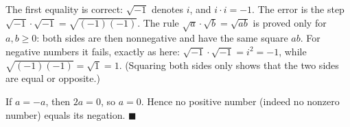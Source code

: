 The first equality is correct: $\sqrt{-1}$ denotes $i$, and $i\cdot i=-1$. The error is the step $\sqrt{-1}\cdot\sqrt{-1}=\sqrt{(-1)(-1)}$. The rule $\sqrt a\cdot\sqrt b=\sqrt{ab}$ is proved only for $a,b\ge0$: both sides are then nonnegative and have the same square $ab$. For negative numbers it fails, exactly as here: $\sqrt{-1}\cdot\sqrt{-1}=i^2=-1$, while $\sqrt{(-1)(-1)}=\sqrt1=1$. (Squaring both sides only shows that the two sides are equal or opposite.)

If $a=-a$, then $2a=0$, so $a=0$. Hence no positive number (indeed no nonzero number) equals its negation. $\blacksquare$
